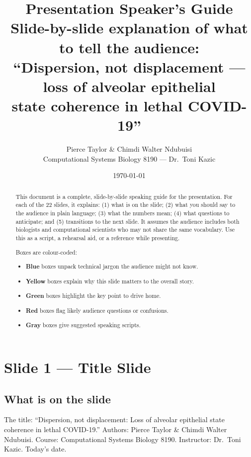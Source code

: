 \documentclass[11pt]{article}
\title{Presentation Speaker's Guide\\
\large{Slide-by-slide explanation of what to tell the audience:\\
``Dispersion, not displacement --- loss of alveolar epithelial\\
state coherence in lethal COVID-19''}}
\author{Pierce Taylor \& Chimdi Walter Ndubuisi\\Computational Systems Biology 8190 --- Dr.\ Toni Kazic}
\date{\today}
\begin{document}
\maketitle

\begin{abstract}
\noindent This document is a complete, slide-by-slide speaking guide for the presentation. For each of the 22 slides, it explains: (1) what is on the slide; (2) what you should say to the audience in plain language; (3) what the numbers mean; (4) what questions to anticipate; and (5) transitions to the next slide. It assumes the audience includes both biologists and computational scientists who may not share the same vocabulary. Use this as a script, a rehearsal aid, or a reference while presenting.

Boxes are colour-coded:
\begin{itemize}
\item \textcolor{blue!55!black}{\textbf{Blue}} boxes unpack technical jargon the audience might not know.
\item \textcolor{orange!60!black}{\textbf{Yellow}} boxes explain why this slide matters to the overall story.
\item \textcolor{green!45!black}{\textbf{Green}} boxes highlight the key point to drive home.
\item \textcolor{red!60!black}{\textbf{Red}} boxes flag likely audience questions or confusions.
\item \textcolor{gray!60!black}{\textbf{Gray}} boxes give suggested speaking scripts.
\end{itemize}
\end{abstract}

\tableofcontents
\clearpage


\section{Slide 1 --- Title Slide}

\subsection{What is on the slide}

The title: ``Dispersion, not displacement: Loss of alveolar epithelial state coherence in lethal COVID-19.'' Authors: Pierce Taylor \& Chimdi Walter Ndubuisi. Course: Computational Systems Biology 8190. Instructor: Dr.\ Toni Kazic. Today's date.
\end{document}
